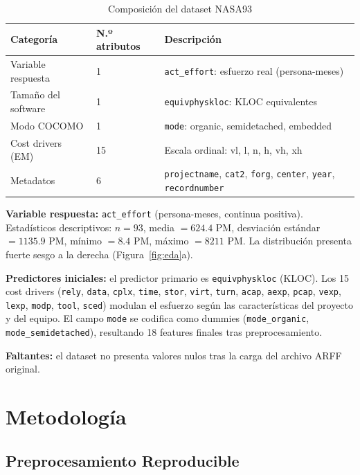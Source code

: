 \documentclass[11pt,a4paper]{article}
\begin{document}
\begin{table}[!ht]
\caption{Composición del dataset NASA93}\label{tab:dataset}
\centering
\renewcommand{\arraystretch}{1.25}
\begin{tabularx}{\textwidth}{|p{3.5cm}|p{2.2cm}|X|}
\hline
\rowcolor{headerblue}\color{white}\textbf{Categoría} &
\color{white}\textbf{N.º atributos} &
\color{white}\textbf{Descripción} \\
\hline
Variable respuesta & 1 & \texttt{act\_effort}: esfuerzo real (persona-meses) \\
\hline
\rowcolor{rowgray}
Tamaño del software & 1 & \texttt{equivphyskloc}: KLOC equivalentes \\
\hline
Modo COCOMO & 1 & \texttt{mode}: organic, semidetached, embedded \\
\hline
\rowcolor{rowgray}
Cost drivers (EM) & 15 & Escala ordinal: vl, l, n, h, vh, xh \\
\hline
Metadatos & 6 & \texttt{projectname}, \texttt{cat2}, \texttt{forg}, \texttt{center}, \texttt{year}, \texttt{recordnumber} \\
\hline
\end{tabularx}
\end{table}

\noindent\textbf{Variable respuesta:} \texttt{act\_effort} (persona-meses, continua positiva). Estadísticos descriptivos: $n=93$, media $=624.4$ PM, desviación estándar $=1135.9$ PM, mínimo $=8.4$ PM, máximo $=8211$ PM. La distribución presenta fuerte sesgo a la derecha (Figura~\ref{fig:eda}a).

\noindent\textbf{Predictores iniciales:} el predictor primario es \texttt{equivphyskloc} (KLOC). Los 15 cost drivers (\texttt{rely}, \texttt{data}, \texttt{cplx}, \texttt{time}, \texttt{stor}, \texttt{virt}, \texttt{turn}, \texttt{acap}, \texttt{aexp}, \texttt{pcap}, \texttt{vexp}, \texttt{lexp}, \texttt{modp}, \texttt{tool}, \texttt{sced}) modulan el esfuerzo según las características del proyecto y del equipo. El campo \texttt{mode} se codifica como dummies (\texttt{mode\_organic}, \texttt{mode\_semidetached}), resultando 18 features finales tras preprocesamiento.

\noindent\textbf{Faltantes:} el dataset no presenta valores nulos tras la carga del archivo ARFF original.

\section{Metodología}

\subsection{Preprocesamiento Reproducible}
\end{document}
